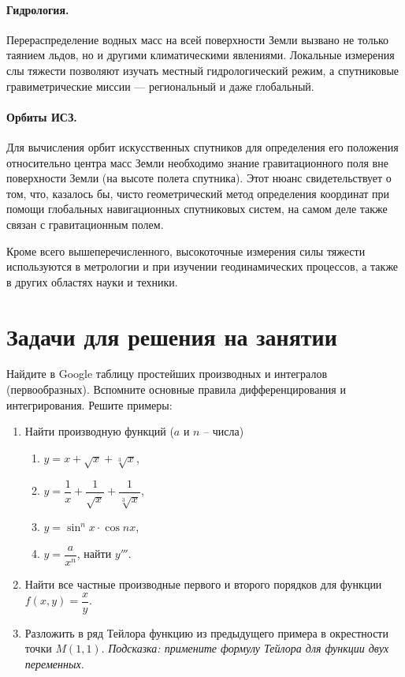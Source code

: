 \documentclass[11pt, a4paper]{article}
\theoremstyle{plain}
\theoremstyle{definition}
\theoremstyle{remark}
\begin{document}
\paragraph{Гидрология.} Перераспределение водных масс на всей поверхности Земли вызвано не только
таянием льдов, но и другими климатическими явлениями. Локальные измерения слы тяжести позволяют
изучать местный гидрологический режим, а спутниковые гравиметрические миссии --- региональный и даже
глобальный. 
\paragraph{Орбиты ИСЗ.} Для вычисления орбит искусственных спутников для определения его положения относительно центра
масс Земли необходимо знание гравитационного поля вне поверхности Земли (на высоте полета спутника). Этот нюанс свидетельствует
о том, что, казалось бы, чисто геометрический метод определения координат при помощи глобальных
навигационных спутниковых систем, на самом деле также связан с гравитационным полем.

Кроме всего вышеперечисленного, высокоточные измерения силы тяжести используются в метрологии и при
изучении геодинамических процессов, а также в других областях науки и техники.

\section{Задачи для решения на занятии}
Найдите в Google таблицу простейших производных и интегралов (первообразных). Вспомните основные правила дифференцирования и интегрирования. Решите примеры:

\begin{enumerate} 
	\item Найти производную функций ($a$ и $n$ -- числа)
		\begin{enumerate} 
			\item $y = x + \sqrt{x} + \sqrt[3]{x}$,
			\item $y = \dfrac{1}{x} + \dfrac{1}{\sqrt{x}} + \dfrac{1}{\sqrt[3]{x}}$,
			\item $y = \sin^n{x}\cdot\cos{nx}$,
			\item $y = \dfrac{a}{x^n}$, найти $y'''$.
		\end{enumerate} 
	\item Найти все частные производные первого и второго порядков для функции
	$f\left( x, y \right) = \dfrac{x}{y}$.
	\item Разложить в ряд Тейлора функцию из предыдущего примера в окрестности точки $M(1, 1)$.
	\textit{Подсказка: примените формулу Тейлора для функции двух переменных.}
\end{enumerate} 
	
\printbibliography
\end{document}
